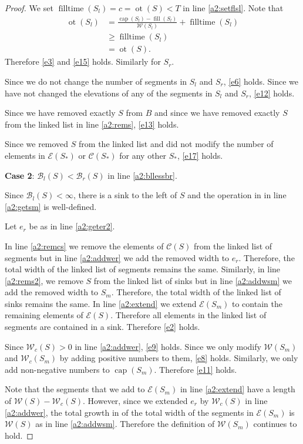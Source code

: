\documentclass[11pt,a4paper]{article}
\DeclareMathOperator{\capp}{cap}
\DeclareMathOperator{\ot}{ot}
\DeclareMathOperator{\Fill}{fill}
\DeclareMathOperator{\filltime}{filltime}
\begin{document}
\begin{proof}
We set $\filltime(S_l) = c = \ot(S) < T$ in line \ref{a2:setflsl}.
Note that
\begin{align*}
    \ot(S_l) &= \frac{\capp(S_l) - \Fill(S_l)}{\mathcal{W}(S_l)} + \filltime(S_l) \\
             &\ge \filltime(S_l) \\
             &= \ot(S).
\end{align*}
Therefore \ref{e3} and \ref{e15} holds.
Similarly for $S_r$.

Since we do not change the number of segments in $S_l$ and $S_r$, \ref{e6} holds.
Since we have not changed the elevations of any of the segments in $S_l$ and $S_r$, \ref{e12} holds.

Since we have removed exactly $S$ from $B$ and since we have removed exactly $S$ from the linked list in line \ref{a2:rems}, \ref{e13} holds.

Since we removed $S$ from the linked list and did not modify the number of elements in $\mathcal{E}(S_*)$ or $\mathcal{C}(S_*)$ for any other $S_*$, \ref{e17} holds.

\textbf{Case 2}: $\mathcal{B}_l(S) < \mathcal{B}_r(S)$ in line \ref{a2:bllessbr}.

Since $\mathcal{B}_l(S) < \infty$, there is a sink to the left of $S$ and the operation in
in line \ref{a2:getsm} is well-defined.

Let $e_r$ be as in line \ref{a2:geter2}.

In line \ref{a2:remcs} we remove the elements of $\mathcal{C}(S)$ from the linked list of segments but in line \ref{a2:addwer} we add the removed width to $e_r$.
Therefore, the total width of the linked list of segments remains the same.
Similarly, in line \ref{a2:rems2}, we remove $S$ from the linked list of sinks but in line \ref{a2:addwsm} we add the removed width to $S_m$.
Therefore, the total width of the linked list of sinks remains the same.
In line \ref{a2:extend} we extend $\mathcal{E}(S_m)$ to contain the remaining elements of $\mathcal{E}(S)$.
Therefore all elements in the linked list of segments are contained in a sink.
Therefore \ref{e2} holds.

Since $\mathcal{W}_c(S) > 0$ in line \ref{a2:addwer}, \ref{e9} holds.
Since we only modify $\mathcal{W}(S_m)$ and $\mathcal{W}_c(S_m)$ by adding positive numbers to them, \ref{e8} holds.
Similarly, we only add non-negative numbers to $\capp(S_m)$.
Therefore \ref{e11} holds.

Note that the segments that we add to $\mathcal{E}(S_m)$ in line \ref{a2:extend} have a length of $\mathcal{W}(S) - \mathcal{W}_c(S)$.
However, since we extended $e_r$ by $\mathcal{W}_c(S)$ in line \ref{a2:addwer}, the total growth in of the total width of the segments in $\mathcal{E}(S_m)$ is $\mathcal{W}(S)$ as in line \ref{a2:addwsm}.
Therefore the definition of $\mathcal{W}(S_m)$ continues to hold.


\end{proof}
\end{document}
